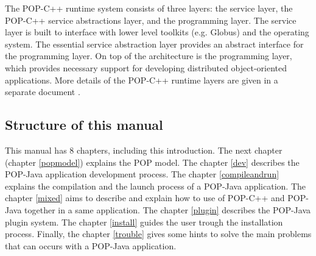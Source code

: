 The POP-C++ runtime system consists of three layers: the service layer,
the POP-C++ service abstractions layer, and the programming layer. The
service layer is built to interface with lower level toolkits (e.g.
Globus) and the operating system. The essential service abstraction layer
provides an abstract interface for the programming layer. On top of the
architecture is the programming layer, which provides necessary support
for developing distributed object-oriented applications. More details of
the POP-C++ runtime layers are given in a separate document \cite{Nguyen04}.

\subsection{Structure of this manual}
This manual has 8 chapters, including this introduction. The next chapter (chapter \ref{popmodel}) explains the POP model. The chapter \ref{dev} describes the POP-Java application development process. The chapter \ref{compileandrun} explains the compilation and the launch process of a POP-Java application. The chapter \ref{mixed} aims to describe and explain how to use of POP-C++ and POP-Java together in a same application. The chapter \ref{plugin} describes the POP-Java plugin system. The chapter \ref{install} guides the user trough the installation process. Finally, the chapter \ref{trouble} gives some hints to solve the main problems that can occurs with a POP-Java application.

